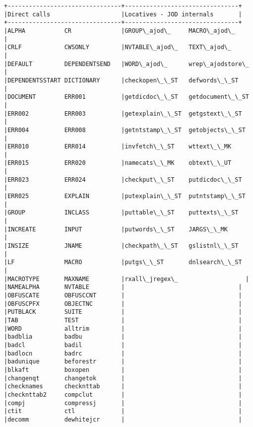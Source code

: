 \documentclass[11pt,letter,landscape]{article}
\begin{document}
    \begin{Verbatim}[commandchars=\\\{\}]
+--------------------------------+--------------------------------+
|Direct calls                    |Locatives - JOD internals       |
+--------------------------------+--------------------------------+
|ALPHA           CR              |GROUP\_ajod\_     MACRO\_ajod\_     |
|CRLF            CWSONLY         |NVTABLE\_ajod\_   TEXT\_ajod\_      |
|DEFAULT         DEPENDENTSEND   |WORD\_ajod\_      wrep\_ajodstore\_ |
|DEPENDENTSSTART DICTIONARY      |checkopen\_\_ST   defwords\_\_ST    |
|DOCUMENT        ERR001          |getdicdoc\_\_ST   getdocument\_\_ST |
|ERR002          ERR003          |getexplain\_\_ST  getgstext\_\_ST   |
|ERR004          ERR008          |getntstamp\_\_ST  getobjects\_\_ST  |
|ERR010          ERR014          |invfetch\_\_ST    wttext\_\_MK      |
|ERR015          ERR020          |namecats\_\_MK    obtext\_\_UT      |
|ERR023          ERR024          |checkput\_\_ST    putdicdoc\_\_ST   |
|ERR025          EXPLAIN         |putexplain\_\_ST  putntstamp\_\_ST  |
|GROUP           INCLASS         |puttable\_\_ST    puttexts\_\_ST    |
|INCREATE        INPUT           |putwords\_\_ST    JARGS\_\_MK       |
|INSIZE          JNAME           |checkpath\_\_ST   gslistnl\_\_ST    |
|LF              MACRO           |putgs\_\_ST       dnlsearch\_\_ST   |
|MACROTYPE       MAXNAME         |rxall\_jregex\_                   |
|NAMEALPHA       NVTABLE         |                                |
|OBFUSCATE       OBFUSCCNT       |                                |
|OBFUSCPFX       OBJECTNC        |                                |
|PUTBLACK        SUITE           |                                |
|TAB             TEST            |                                |
|WORD            alltrim         |                                |
|badblia         badbu           |                                |
|badcl           badil           |                                |
|badlocn         badrc           |                                |
|badunique       beforestr       |                                |
|blkaft          boxopen         |                                |
|changenqt       changetok       |                                |
|checknames      checknttab      |                                |
|checknttab2     compclut        |                                |
|compj           compressj       |                                |
|ctit            ctl             |                                |
|decomm          dewhitejcr      |                                |

\end{Verbatim}
\end{document}

